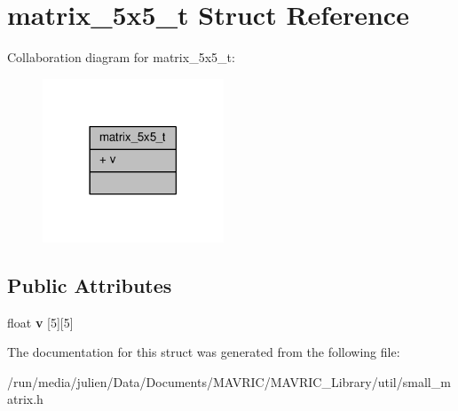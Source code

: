 \hypertarget{structmatrix__5x5__t}{\section{matrix\+\_\+5x5\+\_\+t Struct Reference}
\label{structmatrix__5x5__t}
}


Collaboration diagram for matrix\+\_\+5x5\+\_\+t\+:
\nopagebreak
\begin{figure}[H]
\begin{center}
\leavevmode
\includegraphics[width=153pt]{structmatrix__5x5__t__coll__graph}
\end{center}
\end{figure}
\subsection*{Public Attributes}
\begin{DoxyCompactItemize}
\item 
\hypertarget{structmatrix__5x5__t_a9d6ab560c56fea1965d0088d20289aa6}{float {\bfseries v} \mbox{[}5\mbox{]}\mbox{[}5\mbox{]}}\label{structmatrix__5x5__t_a9d6ab560c56fea1965d0088d20289aa6}

\end{DoxyCompactItemize}


The documentation for this struct was generated from the following file\+:\begin{DoxyCompactItemize}
\item 
/run/media/julien/\+Data/\+Documents/\+M\+A\+V\+R\+I\+C/\+M\+A\+V\+R\+I\+C\+\_\+\+Library/util/small\+\_\+matrix.\+h\end{DoxyCompactItemize}
